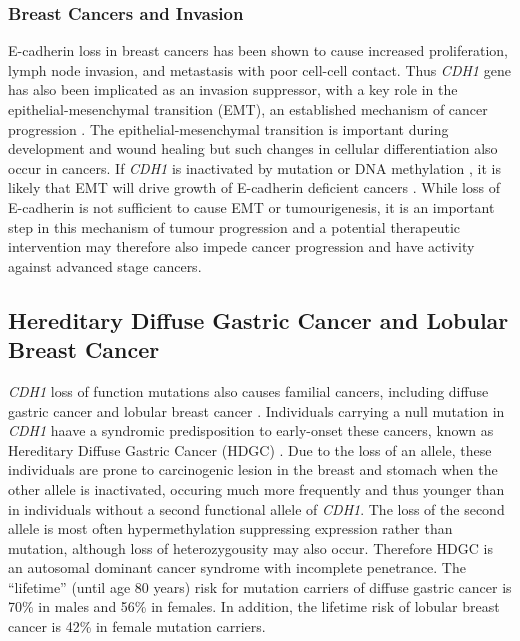 \subsubsection{Breast Cancers and Invasion}
E-cadherin loss in breast cancers has been shown to cause increased proliferation, lymph node invasion, and metastasis with poor cell-cell contact. Thus \textit{CDH1} gene has also been implicated as an invasion suppressor, with a key role in the epithelial-mesenchymal transition (EMT), an established mechanism of cancer progression \citep{Hanahan2011}. The epithelial-mesenchymal transition is important during development and wound healing but such changes in cellular differentiation also occur in cancers. If \textit{CDH1} is inactivated by mutation or DNA methylation \citep{Berx1996,Guilford1999,Machado2001}, it is likely that EMT will drive growth of E-cadherin deficient cancers \citep{Berx2009,Graziano2003,Polyak2009}. While loss of E-cadherin is not sufficient to cause EMT or tumourigenesis, it is an important step in this mechanism of tumour progression and a potential therapeutic intervention may therefore also impede cancer progression and have activity against advanced stage cancers.

\subsection{Hereditary Diffuse Gastric Cancer and Lobular Breast Cancer}
\textit{CDH1} loss of function mutations also causes familial cancers, including diffuse gastric cancer and lobular breast cancer \citep{HDGC,Graziano2003,Guilford2010,Oliveira2009}. Individuals carrying a null mutation in \textit{CDH1} haave a syndromic predisposition to early-onset these cancers, known as Hereditary Diffuse Gastric Cancer (HDGC) \citep{Guilford1998}. Due to the loss of an allele, these individuals are prone to carcinogenic lesion in the breast and stomach when the other allele is inactivated, occuring much more frequently and thus younger than in individuals without a second functional allele of \textit{CDH1}. The loss of the second allele is most often hypermethylation suppressing expression rather than mutation, although loss of heterozygousity may also occur. Therefore HDGC is an autosomal dominant cancer syndrome with incomplete penetrance. The ``lifetime'' (until age 80 years) risk for mutation carriers  of diffuse gastric cancer is 70\% in males and 56\% in females. In addition, the lifetime risk of lobular breast cancer is 42\% in female mutation carriers.   

